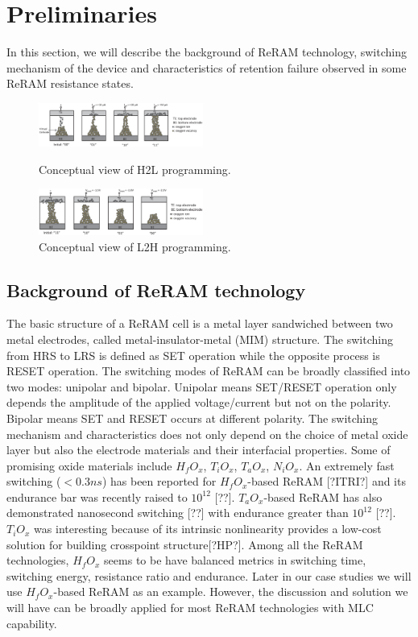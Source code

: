 \section{Preliminaries} \label{sec:preliminary}

In this section, we will describe the background of ReRAM technology, switching mechanism of the device and characteristics of retention failure observed in some ReRAM resistance states.

\begin{figure}[t]
\centering
\includegraphics[width=0.48\textwidth]{fig/h2lview}
\vspace{-10pt}
\caption{Conceptual view of H2L programming.}
\label{fig:h2l}
\vspace{7pt}
\includegraphics[width=0.48\textwidth]{fig/l2hview}
\vspace{-10pt}
\caption{Conceptual view of L2H programming.}
\label{fig:l2h}
\end{figure}

\subsection{Background of ReRAM technology}
The basic structure of a ReRAM cell is a metal layer sandwiched between two metal electrodes, called metal-insulator-metal (MIM) structure. The switching from HRS to LRS is defined as SET operation while the opposite process is RESET operation. The switching modes of ReRAM can be broadly classified into two modes: unipolar and bipolar. Unipolar means SET/RESET operation only depends the amplitude of the applied voltage/current but not on the polarity. Bipolar means SET and RESET occurs at different polarity. The switching mechanism and characteristics does not only depend on the choice of metal oxide layer but also the electrode materials and their interfacial properties. Some of promising oxide materials include $H_fO_x$, $T_iO_x$, $T_aO_x$, $N_iO_x$. An extremely fast switching ($<0.3ns$) has been reported for $H_fO_x$-based ReRAM [?ITRI?] and its endurance bar was recently raised to $10^{12}$ [??]. $T_aO_x$-based ReRAM has also demonstrated nanosecond switching [??] with endurance greater than $10^{12}$ [??]. $T_iO_x$ was interesting because of its intrinsic nonlinearity provides a low-cost solution for building crosspoint structure[?HP?]. Among all the ReRAM technologies, $H_fO_x$ seems to be have balanced metrics in switching time, switching energy, resistance ratio and endurance. Later in our case studies we will use $H_fO_x$-based ReRAM as an example. However, the discussion and solution we will have can be broadly applied for most ReRAM technologies with MLC capability.

